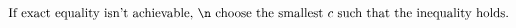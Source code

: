 \documentclass[preview]{standalone}
\begin{document}
\begin{align*}
\text{If exact equality isn't achievable, \n choose the smallest $c$ such that the inequality holds.}
\end{align*}
\end{document}
